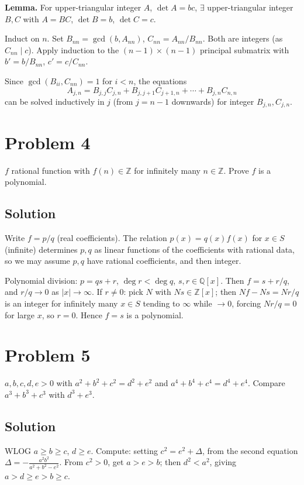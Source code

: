 \documentclass{article}
\begin{document}
\textbf{Lemma.} For upper-triangular integer $A$, $\det A = bc$, $\exists$ upper-triangular integer $B, C$ with $A = BC$, $\det B = b$, $\det C = c$.

Induct on $n$. Set $B_{nn} = \gcd(b, A_{nn})$, $C_{nn} = A_{nn}/B_{nn}$. Both are integers (as $C_{nn} \mid c$). Apply induction to the $(n-1) \times (n-1)$ principal submatrix with $b' = b/B_{nn}$, $c' = c/C_{nn}$.

Since $\gcd(B_{ii}, C_{nn}) = 1$ for $i < n$, the equations
\[
A_{j, n} = B_{j,j} C_{j,n} + B_{j, j+1} C_{j+1, n} + \cdots + B_{j, n} C_{n, n}
\]
can be solved inductively in $j$ (from $j = n - 1$ downwards) for integer $B_{j,n}, C_{j,n}$.

\section*{Problem 4}
$f$ rational function with $f(n) \in \mathbb{Z}$ for infinitely many $n \in \mathbb{Z}$. Prove $f$ is a polynomial.

\subsection*{Solution}
Write $f = p/q$ (real coefficients). The relation $p(x) = q(x) f(x)$ for $x \in S$ (infinite) determines $p, q$ as linear functions of the coefficients with rational data, so we may assume $p, q$ have rational coefficients, and then integer.

Polynomial division: $p = qs + r$, $\deg r < \deg q$, $s, r \in \mathbb{Q}[x]$. Then $f = s + r/q$, and $r/q \to 0$ as $|x| \to \infty$. If $r \ne 0$: pick $N$ with $N s \in \mathbb{Z}[x]$; then $Nf - Ns = Nr/q$ is an integer for infinitely many $x \in S$ tending to $\infty$ while $\to 0$, forcing $Nr/q = 0$ for large $x$, so $r = 0$. Hence $f = s$ is a polynomial.

\section*{Problem 5}
$a, b, c, d, e > 0$ with $a^2 + b^2 + c^2 = d^2 + e^2$ and $a^4 + b^4 + c^4 = d^4 + e^4$. Compare $a^3 + b^3 + c^3$ with $d^3 + e^3$.

\subsection*{Solution}
WLOG $a \ge b \ge c$, $d \ge e$. Compute: setting $c^2 = e^2 + \Delta$, from the second equation $\Delta = -\tfrac{a^2 b^2}{a^2 + b^2 - e^2}$. From $c^2 > 0$, get $a > e > b$; then $d^2 < a^2$, giving $a > d \ge e > b \ge c$.
\end{document}
